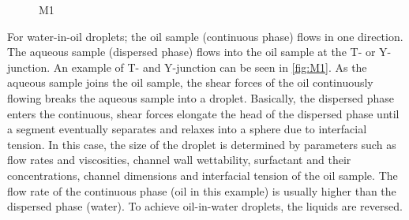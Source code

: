 \begin{figure}
\begin{subfigure}[b]{0.45\textwidth}
\caption{} \label{fig:c}
\end{subfigure}%
\caption{M1} \label{fig:M1}

\end{figure}





\noindent For water-in-oil droplets; the oil sample (continuous phase) flows in one direction. The aqueous sample (dispersed phase) flows into the oil sample at the T- or Y-junction. An example of T- and Y-junction can be seen in \autoref{fig:M1}. As the aqueous sample joins the oil sample, the shear forces of the oil continuously flowing breaks the aqueous sample into a droplet. Basically, the dispersed phase enters the continuous, shear forces elongate the head of the dispersed phase until a segment eventually separates and relaxes into a sphere due to interfacial tension. In this case, the size of the droplet is determined by parameters such as flow rates and viscosities, channel wall wettability, surfactant and their concentrations, channel dimensions and interfacial tension of the oil sample. The flow rate of the continuous phase (oil in this example) is usually higher than the dispersed phase (water). To achieve oil-in-water droplets, the liquids are reversed. \parencite{Zhu2017}




